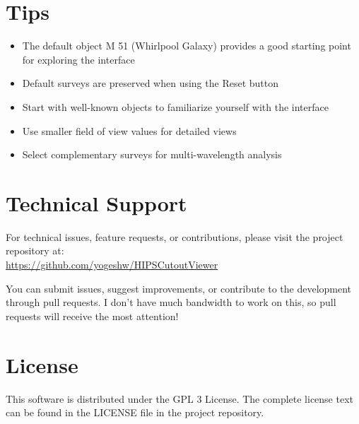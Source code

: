 \documentclass{article}
\begin{document}
\section{Tips}
\begin{itemize}
    \item The default object M 51 (Whirlpool Galaxy) provides a good starting point for exploring the interface
    \item Default surveys are preserved when using the Reset button
    \item Start with well-known objects to familiarize yourself with the interface
    \item Use smaller field of view values for detailed views
    \item Select complementary surveys for multi-wavelength analysis
\end{itemize}

\section{Technical Support}
For technical issues, feature requests, or contributions, please visit the project repository at:\\
\url{https://github.com/yogeshw/HIPSCutoutViewer}

You can submit issues, suggest improvements, or contribute to the development through pull requests. I don't have much bandwidth to work on this, so pull requests will receive the most attention!

\section{License}
This software is distributed under the GPL 3 License. The complete license text can be found in the LICENSE file in the project repository.
\end{document}
